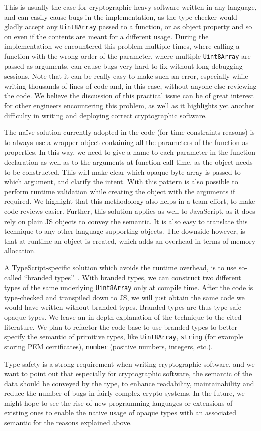 This is usually the case for cryptographic heavy software written in any language, 
and can easily cause bugs in the implementation, as the type checker
would gladly accept any \texttt{Uint8Array} passed to a function, or as object 
property and so on even if the contents are meant for a different usage. 
During the implementation we encountered this problem multiple times,
where calling a function with the wrong order of the parameter, where
multiple \texttt{Uint8Array} are passed as arguments, can cause bugs
very hard to fix without long debugging sessions. Note that it can be
really easy to make such an error, especially while writing thousands
of lines of code and, in this case, without anyone else reviewing the code.
We believe the discussion of this practical issue can be of great interest for other
engineers encountering this problem, as well as it highlights yet another
difficulty in writing and deploying correct cryptographic software.

The na\"ive solution currently adopted in the code (for time constraints reasons)
is to always use a wrapper object containing all the parameters of the function
as properties. In this way, we need to give a name to each parameter
in the function declaration as well as to the arguments at function-call
time, as the object needs to be constructed. This will make clear which
opaque byte array is passed to which argument, and clarify the intent.
With this pattern is also possible to perform runtime validation
while creating the object with the arguments if required.
We highlight that this methodology also helps in a team effort, to make
code reviews easier. Further, this solution applies as well to JavaScript,
as it does rely on plain JS objects to convey the semantic. It is also
easy to translate this technique to any other language supporting objects.
The downside however, is that at runtime an object is created, which adds 
an overhead in terms of memory allocation.

A TypeScript-specific solution which avoids the runtime overhead, is to use
so-called ``branded types''~\cite{vanderkam2019effective, goldberg2022learning}. 
With branded types, we can construct two 
different types of the same underlying \texttt{Uint8Array} only
at compile time. After the code is type-checked and transpiled down to JS,
we will just obtain the same code we would have written without branded types.
Branded types are thus type-safe opaque types. We leave an in-depth explanation
of the technique to the cited literature. We plan to refactor the code base
to use branded types to better specify the semantic of primitive types,
like \texttt{Uint8Array}, \texttt{string} (for example storing PEM certificates),
\texttt{number} (positive numbers, integers, etc.).

Type-safety is a strong requirement when writing
cryptographic software, and we want to point out that especially for cryptographic
software, the semantic of the data should be conveyed by the type,
to enhance readability, maintainability and reduce the number of
bugs in fairly complex crypto systems.
In the future, we
might hope to see the rise of new programming languages
or extensions of existing ones to enable the native usage
of opaque types with an associated semantic for the reasons 
explained above.

